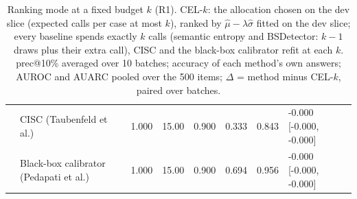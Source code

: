 \begin{table}[t]
\begin{tabular}{llrrrrrl}
 & CISC (Taubenfeld et al.) & 1.000 & 15.00 & 0.900 & 0.333 & 0.843 & -0.000 [-0.000, -0.000] \\
 & Black-box calibrator (Pedapati et al.) & 1.000 & 15.00 & 0.900 & 0.694 & 0.956 & -0.000 [-0.000, -0.000] \\
\bottomrule
\end{tabular}
\caption{Ranking mode at a fixed budget $k$ (R1). CEL-$k$: the allocation chosen on the dev slice (expected calls per case at most $k$), ranked by $\hat\mu - \lambda\hat\sigma$ fitted on the dev slice; every baseline spends exactly $k$ calls (semantic entropy and BSDetector: $k-1$ draws plus their extra call), CISC and the black-box calibrator refit at each $k$. prec@10\% averaged over 10 batches; accuracy of each method's own answers; AUROC and AUARC pooled over the 500 items; $\Delta$ = method minus CEL-$k$, paired over batches.}
\label{tab:budget_curve}
\end{table}
